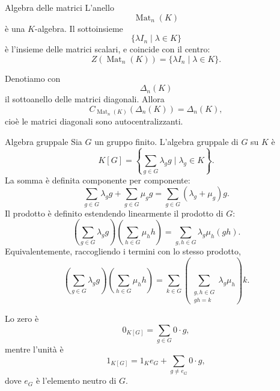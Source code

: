 \documentclass[a4paper]{article}
\begin{document}
\begin{radioactive}
\begin{snippetexample}{Algebra delle matrici}
    L'anello
    \[
        \operatorname{Mat}_n(K)
    \]
    è una \(K\)-algebra. Il sottoinsieme
    \[
        \{\lambda I_n\mid \lambda\in K\}
    \]
    è l'insieme delle matrici scalari, e coincide con il centro:
    \[
        Z(\operatorname{Mat}_n(K))
        =
        \{\lambda I_n\mid \lambda\in K\}.
    \]

    Denotiamo con
    \[
        \Delta_n(K)
    \]
    il sottoanello delle matrici diagonali. Allora
    \[
        C_{\operatorname{Mat}_n(K)}(\Delta_n(K))=\Delta_n(K),
    \]
    cioè le matrici diagonali sono autocentralizzanti.
\end{snippetexample}
\end{radioactive}

\begin{radioactive}
\begin{snippetexample}{Algebra gruppale}
    Sia \(G\) un gruppo finito. L'algebra gruppale di \(G\) su \(K\) è
    \[
        K[G]
        =
        \left\{
            \sum_{g\in G}\lambda_g g
            \mid
            \lambda_g\in K
        \right\}.
    \]
    La somma è definita componente per componente:
    \[
        \sum_{g\in G}\lambda_g g
        +
        \sum_{g\in G}\mu_g g
        =
        \sum_{g\in G}(\lambda_g+\mu_g)g.
    \]
    Il prodotto è definito estendendo linearmente il prodotto di \(G\):
    \[
        \left(\sum_{g\in G}\lambda_g g\right)
        \left(\sum_{h\in G}\mu_h h\right)
        =
        \sum_{g,h\in G}\lambda_g\mu_h(gh).
    \]
    Equivalentemente, raccogliendo i termini con lo stesso prodotto,
    \[
        \left(\sum_{g\in G}\lambda_g g\right)
        \left(\sum_{h\in G}\mu_h h\right)
        =
        \sum_{k\in G}
        \left(
            \sum_{\substack{g,h\in G\\ gh=k}}
            \lambda_g\mu_h
        \right)k.
    \]

    Lo zero è
    \[
        0_{K[G]}=\sum_{g\in G}0\cdot g,
    \]
    mentre l'unità è
    \[
        1_{K[G]}=1_K e_G+\sum_{g\neq e_G}0\cdot g,
    \]
    dove \(e_G\) è l'elemento neutro di \(G\).
\end{snippetexample}
\end{radioactive}
\end{document}
